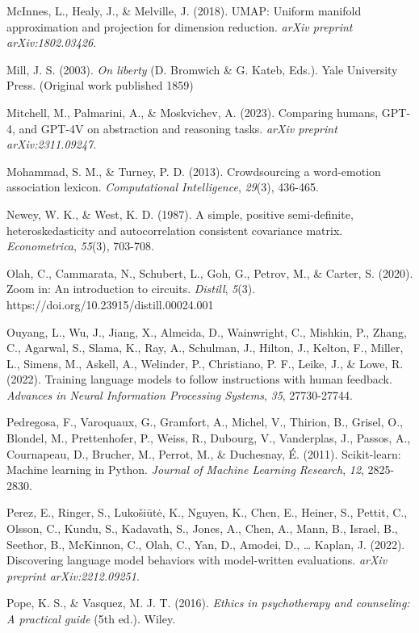 \documentclass[11pt]{article}
\begin{document}
McInnes, L., Healy, J., \& Melville, J. (2018). UMAP: Uniform manifold approximation and projection for dimension reduction. \emph{arXiv preprint arXiv:1802.03426}.

Mill, J. S. (2003). \emph{On liberty} (D. Bromwich \& G. Kateb, Eds.). Yale University Press. (Original work published 1859)

Mitchell, M., Palmarini, A., \& Moskvichev, A. (2023). Comparing humans, GPT-4, and GPT-4V on abstraction and reasoning tasks. \emph{arXiv preprint arXiv:2311.09247}.

Mohammad, S. M., \& Turney, P. D. (2013). Crowdsourcing a word-emotion association lexicon. \emph{Computational Intelligence}, \emph{29}(3), 436-465.

Newey, W. K., \& West, K. D. (1987). A simple, positive semi-definite, heteroskedasticity and autocorrelation consistent covariance matrix. \emph{Econometrica}, \emph{55}(3), 703-708.

Olah, C., Cammarata, N., Schubert, L., Goh, G., Petrov, M., \& Carter, S. (2020). Zoom in: An introduction to circuits. \emph{Distill}, \emph{5}(3). https://doi.org/10.23915/distill.00024.001

Ouyang, L., Wu, J., Jiang, X., Almeida, D., Wainwright, C., Mishkin, P., Zhang, C., Agarwal, S., Slama, K., Ray, A., Schulman, J., Hilton, J., Kelton, F., Miller, L., Simens, M., Askell, A., Welinder, P., Christiano, P. F., Leike, J., \& Lowe, R. (2022). Training language models to follow instructions with human feedback. \emph{Advances in Neural Information Processing Systems}, \emph{35}, 27730-27744.

Pedregosa, F., Varoquaux, G., Gramfort, A., Michel, V., Thirion, B., Grisel, O., Blondel, M., Prettenhofer, P., Weiss, R., Dubourg, V., Vanderplas, J., Passos, A., Cournapeau, D., Brucher, M., Perrot, M., \& Duchesnay, É. (2011). Scikit-learn: Machine learning in Python. \emph{Journal of Machine Learning Research}, \emph{12}, 2825-2830.

Perez, E., Ringer, S., Lukošiūtė, K., Nguyen, K., Chen, E., Heiner, S., Pettit, C., Olsson, C., Kundu, S., Kadavath, S., Jones, A., Chen, A., Mann, B., Israel, B., Seethor, B., McKinnon, C., Olah, C., Yan, D., Amodei, D., \ldots{} Kaplan, J. (2022). Discovering language model behaviors with model-written evaluations. \emph{arXiv preprint arXiv:2212.09251}.

Pope, K. S., \& Vasquez, M. J. T. (2016). \emph{Ethics in psychotherapy and counseling: A practical guide} (5th ed.). Wiley.
\end{document}
